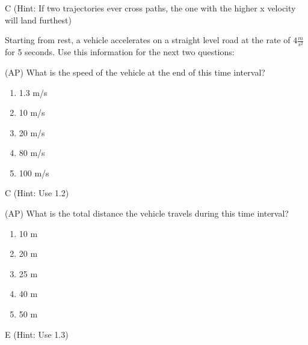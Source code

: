 \begin{solution}
C (Hint: If two trajectories ever cross paths, the one with the higher x velocity will land furthest)
\end{solution}

\newpage
Starting from rest, a vehicle accelerates on a straight level road at the rate of $4 \frac{m}{s^2}$ for 5 seconds. Use this information for the next two questions:


\begin{question}
(AP) What is the speed of the vehicle at the end of this time interval?

\begin{multicols}{5}
\begin{enumerate}[label=(\alph*)]
    \item 1.3 m/s
    \item 10 m/s
    \item 20 m/s
    \item 80 m/s
    \item 100 m/s
\end{enumerate}
\end{multicols}
\end{question}

\begin{solution}
C (Hint: Use 1.2)
\end{solution}


\begin{question}
(AP) What is the total distance the vehicle travels during this time interval?
\begin{multicols}{5}
\begin{enumerate}[label=(\alph*)]
    \item 10 m
    \item 20 m
    \item 25 m
    \item 40 m
    \item 50 m
\end{enumerate}
\end{multicols}
\end{question}

\begin{solution}
E (Hint: Use 1.3)
\end{solution}

